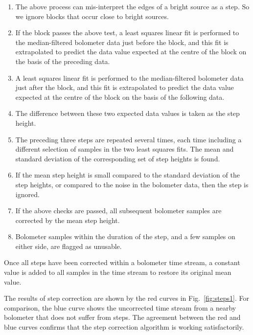 \documentclass[useAMS,usenatbib,nofootinbib]{mn2e}
\begin{document}
\begin{enumerate}

\item The above process can mis-interpret the edges of a bright source
as a step. So we ignore blocks that occur close to bright sources.

\item If the block passes the above test, a least squares linear fit is
performed to the median-filtered bolometer data just before the block, and
this fit is extrapolated to predict the data value expected at the centre
of the block on the basis of the preceding data.

\item A least squares linear fit is performed to the median-filtered
bolometer data just after the block, and this fit is extrapolated to
predict the data value expected at the centre of the block on the basis
of the following data.

\item The difference between these two expected data values is taken as
the step height.

\item The preceding three steps are repeated several times, each time
including a different selection of samples in the two least squares fits.
The mean and standard deviation of the corresponding set of step heights
is found.

\item If the mean step height is small compared to the standard deviation
of the step heights, or compared to the noise in the bolometer data, then
the step is ignored.

\item If the above checks are passed, all subsequent bolometer samples are
corrected by the mean step height.

\item Bolometer samples within the duration of the step, and a few
samples on either side, are flagged as unusable.

\end{enumerate}

Once all steps have been corrected within a bolometer time stream, a
constant value is added to all samples in the time stream to restore its
original mean value.

The results of step correction are shown by the red curves in
Fig.~\ref{fig:steps1}. For comparison, the blue curve shows the
uncorrected time stream from a nearby bolometer that does not suffer from
steps. The agreement between the red and blue curves confirms that
the step correction algorithm is working satisfactorily.
\end{document}
